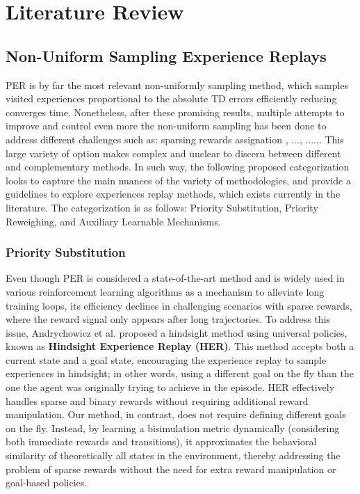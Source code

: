 
\chapter{Literature Review}

\section{Non-Uniform Sampling Experience Replays}

PER \cite{schaul2015prioritized} is by far the most relevant non-uniformly sampling method, which samples visited experiences proportional to the absolute TD errors efficiently reducing converges time. Nonetheless, after these promising results, multiple attempts to improve and control even more the non-uniform sampling has been done to address different challenges such as: sparsing rewards assignation \cite{andrychowicz2017hindsight}, ..., ....,. This large variety of option makes complex and unclear to discern between different and complementary methods. In such way, the following proposed categorization looks to capture the main nuances of the variety of methodologies, and provide a guidelines to explore experiences replay methods, which exists currently in the literature. The categorization is as follows: Priority Substitution, Priority Reweighing, and Auxiliary Learnable Mechanisms.

\subsection{Priority Substitution}

 Even though PER is considered a state-of-the-art method and is widely used in various reinforcement learning algorithms as a mechanism to alleviate long training loops, its efficiency declines in challenging scenarios with sparse rewards, where the reward signal only appears after long trajectories. To address this issue, Andrychowicz et al. \cite{andrychowicz2017hindsight} proposed a hindsight method using universal policies, known as \textbf{Hindsight Experience Replay (HER)}. This method accepts both a current state and a goal state, encouraging the experience replay to sample experiences in hindsight; in other words, using a different goal on the fly than the one the agent was originally trying to achieve in the episode. HER effectively handles sparse and binary rewards without requiring additional reward manipulation. Our method, in contrast, does not require defining different goals on the fly. Instead, by learning a bisimulation metric dynamically (considering both immediate rewards and transitions), it approximates the behavioral similarity of theoretically all states in the environment, thereby addressing the problem of sparse rewards without the need for extra reward manipulation or goal-based policies.

